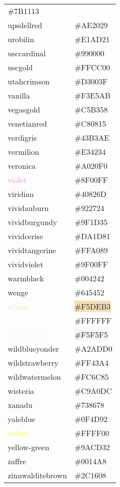 \documentclass[
]{article}
\begin{document}
\begin{longtable}[]{@{}ll@{}}
\colorbox{upmaroon}{\#7B1113}\tabularnewline
\textcolor{upsdellred}{upsdellred} &
\colorbox{upsdellred}{\#AE2029}\tabularnewline
\textcolor{urobilin}{urobilin} &
\colorbox{urobilin}{\#E1AD21}\tabularnewline
\textcolor{usccardinal}{usccardinal} &
\colorbox{oucrimsonred}{\#990000}\tabularnewline
\textcolor{uscgold}{uscgold} &
\colorbox{tangerineyellow}{\#FFCC00}\tabularnewline
\textcolor{utahcrimson}{utahcrimson} &
\colorbox{utahcrimson}{\#D3003F}\tabularnewline
\textcolor{vanilla}{vanilla} &
\colorbox{mediumchampagne}{\#F3E5AB}\tabularnewline
\textcolor{vegasgold}{vegasgold} &
\colorbox{vegasgold}{\#C5B358}\tabularnewline
\textcolor{venetianred}{venetianred} &
\colorbox{venetianred}{\#C80815}\tabularnewline
\textcolor{verdigris}{verdigris} &
\colorbox{verdigris}{\#43B3AE}\tabularnewline
\textcolor{vermilion}{vermilion} &
\colorbox{cinnabar}{\#E34234}\tabularnewline
\textcolor{veronica}{veronica} &
\colorbox{veronica}{\#A020F0}\tabularnewline
\textcolor{violet}{violet} &
\colorbox{electricviolet}{\#8F00FF}\tabularnewline
\textcolor{viridian}{viridian} &
\colorbox{viridian}{\#40826D}\tabularnewline
\textcolor{vividauburn}{vividauburn} &
\colorbox{vividauburn}{\#922724}\tabularnewline
\textcolor{vividburgundy}{vividburgundy} &
\colorbox{vividburgundy}{\#9F1D35}\tabularnewline
\textcolor{vividcerise}{vividcerise} &
\colorbox{vividcerise}{\#DA1D81}\tabularnewline
\textcolor{vividtangerine}{vividtangerine} &
\colorbox{vividtangerine}{\#FFA089}\tabularnewline
\textcolor{vividviolet}{vividviolet} &
\colorbox{vividviolet}{\#9F00FF}\tabularnewline
\textcolor{warmblack}{warmblack} &
\colorbox{warmblack}{\#004242}\tabularnewline
\textcolor{wenge}{wenge} & \colorbox{wenge}{\#645452}\tabularnewline
\textcolor{wheat}{wheat} & \colorbox{wheat}{\#F5DEB3}\tabularnewline
\textcolor{white}{white} & \colorbox{white}{\#FFFFFF}\tabularnewline
\textcolor{whitesmoke}{whitesmoke} &
\colorbox{whitesmoke}{\#F5F5F5}\tabularnewline
\textcolor{wildblueyonder}{wildblueyonder} &
\colorbox{wildblueyonder}{\#A2ADD0}\tabularnewline
\textcolor{wildstrawberry}{wildstrawberry} &
\colorbox{wildstrawberry}{\#FF43A4}\tabularnewline
\textcolor{wildwatermelon}{wildwatermelon} &
\colorbox{wildwatermelon}{\#FC6C85}\tabularnewline
\textcolor{wisteria}{wisteria} &
\colorbox{wisteria}{\#C9A0DC}\tabularnewline
\textcolor{xanadu}{xanadu} & \colorbox{xanadu}{\#738678}\tabularnewline
\textcolor{yaleblue}{yaleblue} &
\colorbox{yaleblue}{\#0F4D92}\tabularnewline
\textcolor{yellow}{yellow} &
\colorbox{electricyellow}{\#FFFF00}\tabularnewline
\textcolor{yellow-green}{yellow-green} &
\colorbox{yellow-green}{\#9ACD32}\tabularnewline
\textcolor{zaffre}{zaffre} & \colorbox{zaffre}{\#0014A8}\tabularnewline
\textcolor{zinnwalditebrown}{zinnwalditebrown} &
\colorbox{zinnwalditebrown}{\#2C1608}\tabularnewline
\bottomrule
\end{longtable}
\end{document}
